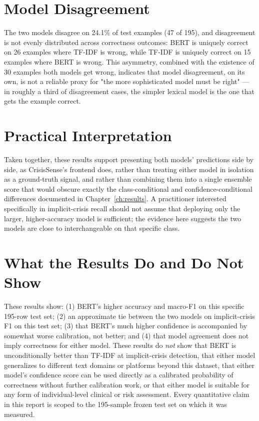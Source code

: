 \section{Model Disagreement}

The two models disagree on 24.1\% of test examples (47 of 195), and disagreement is not evenly distributed across correctness outcomes: BERT is uniquely correct on 26 examples where TF-IDF is wrong, while TF-IDF is uniquely correct on 15 examples where BERT is wrong. This asymmetry, combined with the existence of 30 examples both models get wrong, indicates that model disagreement, on its own, is not a reliable proxy for "the more sophisticated model must be right" --- in roughly a third of disagreement cases, the simpler lexical model is the one that gets the example correct.

\section{Practical Interpretation}

Taken together, these results support presenting both models' predictions side by side, as CrisisSense's frontend does, rather than treating either model in isolation as a ground-truth signal, and rather than combining them into a single ensemble score that would obscure exactly the class-conditional and confidence-conditional differences documented in Chapter~\ref{ch:results}. A practitioner interested specifically in implicit-crisis recall should not assume that deploying only the larger, higher-accuracy model is sufficient; the evidence here suggests the two models are close to interchangeable on that specific class.

\section{What the Results Do and Do Not Show}

These results show: (1) BERT's higher accuracy and macro-F1 on this specific 195-row test set; (2) an approximate tie between the two models on implicit-crisis F1 on this test set; (3) that BERT's much higher confidence is accompanied by somewhat worse calibration, not better; and (4) that model agreement does not imply correctness for either model. These results do \emph{not} show that BERT is unconditionally better than TF-IDF at implicit-crisis detection, that either model generalizes to different text domains or platforms beyond this dataset, that either model's confidence score can be used directly as a calibrated probability of correctness without further calibration work, or that either model is suitable for any form of individual-level clinical or risk assessment. Every quantitative claim in this report is scoped to the 195-sample frozen test set on which it was measured.
